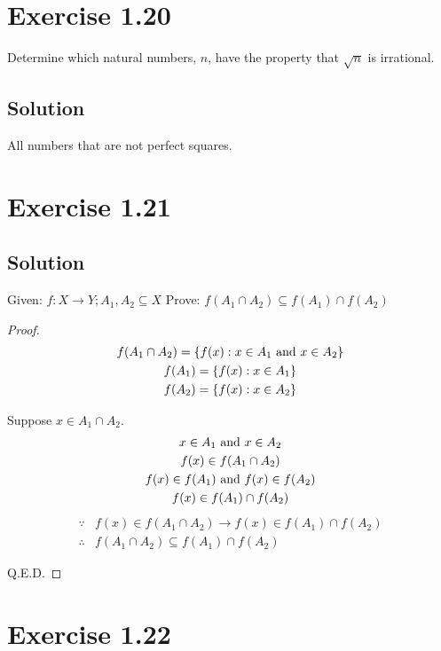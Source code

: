 \documentclass[12pt]{report}
\begin{document}
\pagebreak
\section{Exercise 1.20}
Determine which natural numbers, $n$, have the  property that $\sqrt{n}$ is irrational. 

\subsection*{Solution}
All numbers that are not perfect squares.

\pagebreak
\section{Exercise 1.21}

\subsection*{Solution}
    Given: $f: X \to Y; A_1, A_2 \subseteq X$
    Prove: $f(A_1 \cap A_2) \subseteq f(A_1) \cap f(A_2)$
\begin{proof}
    \begin{gather}
        f(A_1 \cap A_2) = \{f(x) : x \in A_1 \text{ and } x \in A_2\}\\
        f(A_1) = \{f(x) : x \in A_1\}\\
        f(A_2) = \{f(x) : x \in A_2\}
    \end{gather}

    Suppose $x \in A_1 \cap A_2$.
    \begin{gather}
        x \in A_1 \text{ and } x \in A_2\\
        f(x) \in f(A_1 \cap A_2)\\
        f(x) \in f(A_1) \text{ and } f(x) \in f(A_2)\\
        f(x) \in f(A_1) \cap f(A_2)
    \end{gather}
    \begin{align}
        \because    &f(x) \in f(A_1 \cap A_2) \to f(x) \in f(A_1) \cap f(A_2)\\
        \therefore  &f(A_1 \cap A_2) \subseteq f(A_1) \cap f(A_2)
    \end{align}

    Q.E.D.
\end{proof}

\pagebreak
\section{Exercise 1.22}
\end{document}
